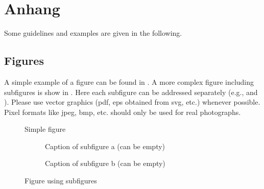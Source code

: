 \chapter{Anhang}

Some guidelines and examples are given in the following.

\section{Figures}

A simple example of a figure can be found in . A more complex figure including subfigures is show in . Here each subfigure can be addressed separately (e.g.,  and ). Please use vector graphics (pdf, eps obtained from svg, etc.) whenever possible. Pixel formats like jpeg, bmp, etc. should only be used for real photographs.

\begin{figure}[!h]
	\centering
	\fbox{\parbox{5cm}{\centering ~\vspace{1.5cm}\\Dummy\\~\vspace{1.5cm}}} %
	\caption{Simple figure}
	\label{fig:simple_figure}
\end{figure}

\begin{figure}[!h]
	\centering
	\begin{subfigure}[b]{7cm}
		\centering
		\fbox{\parbox{5cm}{\centering ~\vspace{1.5cm}\\Dummy\\~\vspace{1.5cm}}} %
		\caption{Caption of subfigure a (can be empty)}
		\label{fig:subfigure1}
	\end{subfigure}
	\begin{subfigure}[b]{7cm}
		\centering
		\fbox{\parbox{5cm}{\centering ~\vspace{1.5cm}\\Dummy\\~\vspace{1.5cm}}} %
		\caption{Caption of subfigure b (can be empty)}
		\label{fig:subfigure2}
	\end{subfigure}
	\caption{Figure using subfigures}
	\label{fig:figure_with_subfigures}
\end{figure}


